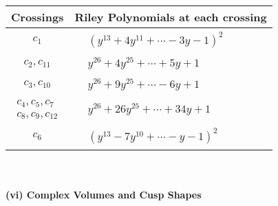 \documentclass[1p]{elsarticle_modified}
\theoremstyle{definition}
\begin{document}
\begin{tabular}{m{50pt}|m{274pt}}
Crossings & \hspace{64pt}Riley Polynomials at each crossing \\
\hline $$\begin{aligned}c_{1}\end{aligned}$$&$\begin{aligned}
&(y^{13}+4 y^{11}+\cdots-3 y-1)^{2}
\end{aligned}$\\
\hline $$\begin{aligned}c_{2},c_{11}\end{aligned}$$&$\begin{aligned}
&y^{26}+4 y^{25}+\cdots+5 y+1
\end{aligned}$\\
\hline $$\begin{aligned}c_{3},c_{10}\end{aligned}$$&$\begin{aligned}
&y^{26}+9 y^{25}+\cdots-6 y+1
\end{aligned}$\\
\hline $$\begin{aligned}c_{4},c_{5},c_{7}\\c_{8},c_{9},c_{12}\end{aligned}$$&$\begin{aligned}
&y^{26}+26 y^{25}+\cdots+34 y+1
\end{aligned}$\\
\hline $$\begin{aligned}c_{6}\end{aligned}$$&$\begin{aligned}
&(y^{13}-7 y^{10}+\cdots- y-1)^{2}
\end{aligned}$\\
\hline
\end{tabular}\\~\\
\newpage\flushleft \textbf{(vi) Complex Volumes and Cusp Shapes}
\end{document}

